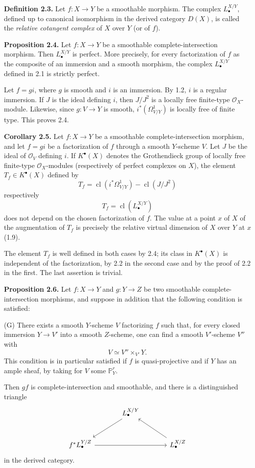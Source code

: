 \textbf{Definition 2.3.} Let $f:X\to Y$ be a smoothable morphism. The complex $L^{X/Y}_\bullet$, defined up to canonical isomorphism in the derived category $D(X)$, is called the \emph{relative cotangent complex} of $X$ over $Y$ (or of $f$).

\textbf{Proposition 2.4.} Let $f:X\to Y$ be a smoothable complete-intersection morphism. Then $L^{X/Y}_\bullet$ is perfect. More precisely, for every factorization of $f$ as the composite of an immersion and a smooth morphism, the complex $L^{X/Y}_\bullet$ defined in 2.1 is strictly perfect.

Let $f=g i$, where $g$ is smooth and $i$ is an immersion. By 1.2, $i$ is a regular immersion. If $J$ is the ideal defining $i$, then $J/J^2$ is a locally free finite-type $\mathcal O_X$-module. Likewise, since $g:V\to Y$ is smooth, $i^*(\Omega^1_{V/Y})$ is locally free of finite type. This proves 2.4.

\textbf{Corollary 2.5.} Let $f:X\to Y$ be a smoothable complete-intersection morphism, and let $f=gi$ be a factorization of $f$ through a smooth $Y$-scheme $V$. Let $J$ be the ideal of $\mathcal O_V$ defining $i$. If $K^{\bullet}(X)$ denotes the Grothendieck group of locally free finite-type $\mathcal O_X$-modules (respectively of perfect complexes on $X$), the element $T_f\in K^{\bullet}(X)$ defined by
\[
T_f=\operatorname{cl}(i^*\Omega^1_{V/Y})-\operatorname{cl}(J/J^2)
\]
respectively
\[
T_f=\operatorname{cl}(L^{X/Y}_\bullet)
\]
does not depend on the chosen factorization of $f$. The value at a point $x$ of $X$ of the augmentation of $T_f$ is precisely the relative virtual dimension of $X$ over $Y$ at $x$ (1.9).

The element $T_f$ is well defined in both cases by 2.4; its class in $K^{\bullet}(X)$ is independent of the factorization, by 2.2 in the second case and by the proof of 2.2 in the first. The last assertion is trivial.

\textbf{Proposition 2.6.} Let $f:X\to Y$ and $g:Y\to Z$ be two smoothable complete-intersection morphisms, and suppose in addition that the following condition is satisfied:

(G) There exists a smooth $Y$-scheme $V$ factorizing $f$ such that, for every closed immersion $Y\to V'$ into a smooth $Z$-scheme, one can find a smooth $V'$-scheme $V''$ with
\[
V \simeq V''\times_{V'}Y.
\]
This condition is in particular satisfied if $f$ is quasi-projective and if $Y$ has an ample sheaf, by taking for $V$ some $\mathbb P^r_Y$.

Then $gf$ is complete-intersection and smoothable, and there is a distinguished triangle
\[
\begin{tikzcd}[column sep=large,row sep=large]
& L^{X/Y}_\bullet \arrow[dl] \\
f^*L^{Y/Z}_\bullet \arrow[rr] && L^{X/Z}_\bullet \arrow[ul]
\end{tikzcd}
\]
in the derived category.

